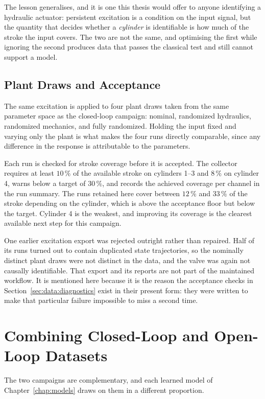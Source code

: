 The lesson generalises, and it is one this thesis would offer to anyone
identifying a hydraulic actuator: persistent excitation is a condition
on the input signal, but the quantity that decides whether a
\emph{cylinder} is identifiable is how much of the stroke the input covers. The two are not the same, and optimising the first
while ignoring the second produces data that passes the classical test
and still cannot support a model.

\subsection{Plant Draws and Acceptance}

The same excitation is applied to four plant draws taken from the same
parameter space as the closed-loop campaign: nominal, randomized
hydraulics, randomized mechanics, and fully randomized. Holding the
input fixed and varying only the plant is what makes the four runs
directly comparable, since any difference in the response is attributable
to the parameters.

Each run is checked for stroke coverage before it is accepted. The
collector requires at least $10\,\%$ of the available stroke on
cylinders 1--3 and $8\,\%$ on cylinder 4, warns below a target of
$30\,\%$, and records the achieved coverage per channel in the run
summary. The runs retained here cover between $12\,\%$ and $33\,\%$ of
the stroke depending on the cylinder, which is above the acceptance
floor but below the target. Cylinder 4 is the weakest, and improving its
coverage is the clearest available next step for this campaign.

One earlier excitation export was rejected outright rather than repaired.
Half of its runs turned out to contain duplicated state trajectories, so
the nominally distinct plant draws were not distinct in the data, and
the valve was again not causally identifiable. That export and its
reports are not part of the maintained workflow. It is mentioned here
because it is the reason the acceptance checks in
Section~\ref{sec:data:diagnostics} exist in their present form: they were
written to make that particular failure impossible to miss a second
time.

\section{Combining Closed-Loop and Open-Loop Datasets}
\label{sec:data:combining}

The two campaigns are complementary, and each learned model of
Chapter~\ref{chap:models} draws on them in a different proportion.

